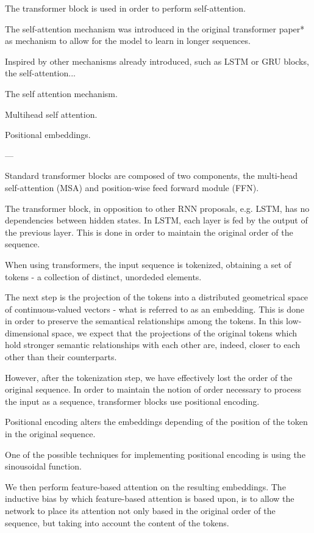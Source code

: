 The transformer block is used in order to perform self-attention.


The self-attention mechanism was introduced in the original transformer paper* as mechanism to allow for the model to learn  in longer sequences.

Inspired by other mechanisms already introduced, such as LSTM or GRU blocks, the self-attention...


The self attention mechanism.


Multihead self attention.



Positional embeddings.


---

Standard transformer blocks are composed of two components, the multi-head self-attention (MSA) and position-wise feed forward module (FFN).


The transformer block, in opposition to other RNN proposals, e.g. LSTM, has no dependencies between hidden states. In LSTM, each layer is fed by the output of the previous layer. This is done in order to maintain the original order of the sequence.


When using transformers, the input sequence is tokenized, obtaining a set of tokens - a collection of distinct, unordeded elements.


The next step is the projection of the tokens into a distributed geometrical space of continuous-valued vectors - what is referred to as an embedding. This is done in order to preserve the semantical relationships among the tokens.
In this low-dimensional space, we expect that the projections of the original tokens which hold stronger semantic relationships with each other are, indeed, closer to each other than their counterparts.


However, after the tokenization step, we have effectively lost the order of the original sequence. In order to maintain the notion of order necessary to process the input as a sequence,
transformer blocks use positional encoding.

Positional encoding alters the embeddings depending of the position of the token in the original sequence.

One of the possible techniques for implementing positional encoding is using the sinousoidal function. 

We then perform feature-based attention on the resulting embeddings.
The inductive bias by which feature-based attention is based upon, is to allow the network to place its attention not only based
in the original order of the sequence, but taking into account the content of the tokens.

